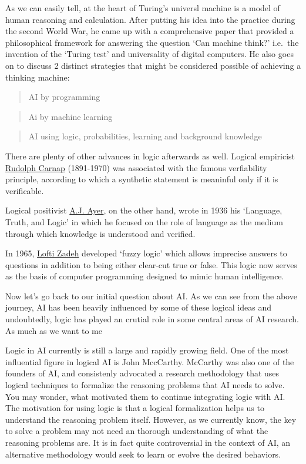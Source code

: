 \documentclass[]{book}
\theoremstyle{definition}
\theoremstyle{definition}
\theoremstyle{definition}
\theoremstyle{remark}
\begin{document}
As we can easily tell, at the heart of Turing's universl machine is a
model of human reasoning and calculation. After putting his idea into
the practice during the second World War, he came up with a
comprehensive paper that provided a philosophical framework for
answering the question `Can machine think?' i.e.~the invention of the
`Turing test' and universality of digital computers. He also goes on to
discuss 2 distinct strategies that might be considered possible of
achieving a thinking machine:

\begin{quote}
AI by programming
\end{quote}

\begin{quote}
Ai by machine learning
\end{quote}

\begin{quote}
AI using logic, probabilities, learning and background knowledge
\end{quote}

There are plenty of other advances in logic afterwards as well. Logical
empiricist \href{}{Rudolph Carnap} (1891-1970) was associated with the
famous verfiability principle, according to which a synthetic statement
is meaninful only if it is verificable.

Logical positivist \href{}{A.J. Ayer}, on the other hand, wrote in 1936
his `Language, Truth, and Logic' in which he focused on the role of
language as the medium through which knowledge is understood and
verified.

In 1965, \href{}{Lofti Zadeh} developed `fuzzy logic' which allows
imprecise answers to questions in addition to being either clear-cut
true or false. This logic now serves as the basis of computer
programming designed to mimic human intelligence.

Now let's go back to our initial question about AI. As we can see from
the above journey, AI has been heavily influenced by some of these
logical ideas and undoubtedly, logic has played an crutial role in some
central areas of AI research. As much as we want to me

Logic in AI currently is still a large and rapidly growing field. One of
the most influential figure in logical AI is John MccCarthy. McCarthy
was also one of the founders of AI, and consistenly advocated a research
methodology that uses logical techniques to formalize the reasoning
problems that AI needs to solve. You may wonder, what motivated them to
continue integrating logic with AI. The motivation for using logic is
that a logical formalization helps us to understand the reasoning
problem itself. However, as we currently know, the key to solve a
problem may not need an thorough understanding of what the reasoning
problems are. It is in fact quite controversial in the context of AI, an
alternative methodology would seek to learn or evolve the desired
behaviors.
\end{document}
